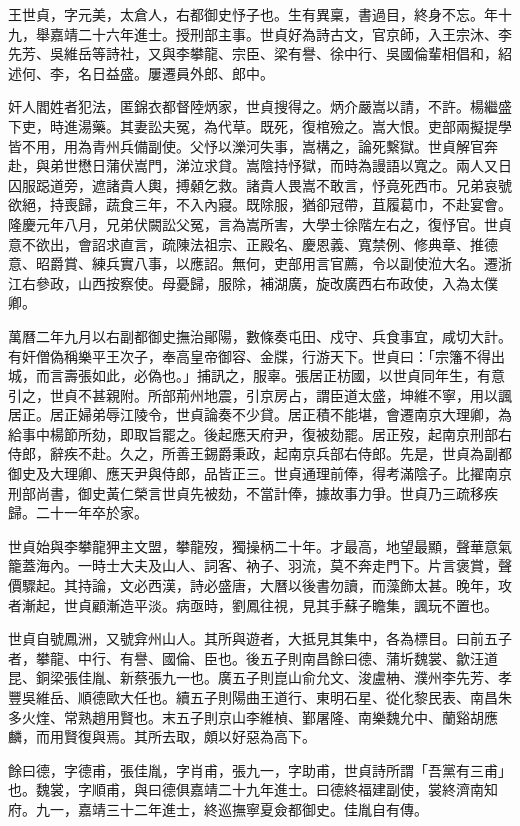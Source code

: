 \begin{pinyinscope}
王世貞，字元美，太倉人，右都御史忬子也。生有異稟，書過目，終身不忘。年十九，舉嘉靖二十六年進士。授刑部主事。世貞好為詩古文，官京師，入王宗沐、李先芳、吳維岳等詩社，又與李攀龍、宗臣、梁有譽、徐中行、吳國倫輩相倡和，紹述何、李，名日益盛。屢遷員外郎、郎中。

奸人閻姓者犯法，匿錦衣都督陸炳家，世貞搜得之。炳介嚴嵩以請，不許。楊繼盛下吏，時進湯藥。其妻訟夫冤，為代草。既死，復棺殮之。嵩大恨。吏部兩擬提學皆不用，用為青州兵備副使。父忬以濼河失事，嵩構之，論死繫獄。世貞解官奔赴，與弟世懋日蒲伏嵩門，涕泣求貸。嵩陰持忬獄，而時為謾語以寬之。兩人又日囚服跽道旁，遮諸貴人輿，搏顙乞救。諸貴人畏嵩不敢言，忬竟死西市。兄弟哀號欲絕，持喪歸，蔬食三年，不入內寢。既除服，猶卻冠帶，苴履葛巾，不赴宴會。隆慶元年八月，兄弟伏闕訟父冤，言為嵩所害，大學士徐階左右之，復忬官。世貞意不欲出，會詔求直言，疏陳法祖宗、正殿名、慶恩義、寬禁例、修典章、推德意、昭爵賞、練兵實八事，以應詔。無何，吏部用言官薦，令以副使涖大名。遷浙江右參政，山西按察使。母憂歸，服除，補湖廣，旋改廣西右布政使，入為太僕卿。

萬曆二年九月以右副都御史撫治鄖陽，數條奏屯田、戍守、兵食事宜，咸切大計。有奸僧偽稱樂平王次子，奉高皇帝御容、金牒，行游天下。世貞曰：「宗籓不得出城，而言壽張如此，必偽也。」捕訊之，服辜。張居正枋國，以世貞同年生，有意引之，世貞不甚親附。所部荊州地震，引京房占，謂臣道太盛，坤維不寧，用以諷居正。居正婦弟辱江陵令，世貞論奏不少貸。居正積不能堪，會遷南京大理卿，為給事中楊節所劾，即取旨罷之。後起應天府尹，復被劾罷。居正歿，起南京刑部右侍郎，辭疾不赴。久之，所善王錫爵秉政，起南京兵部右侍郎。先是，世貞為副都御史及大理卿、應天尹與侍郎，品皆正三。世貞通理前俸，得考滿陰子。比擢南京刑部尚書，御史黃仁榮言世貞先被劾，不當計俸，據故事力爭。世貞乃三疏移疾歸。二十一年卒於家。

世貞始與李攀龍狎主文盟，攀龍歿，獨操柄二十年。才最高，地望最顯，聲華意氣籠蓋海內。一時士大夫及山人、詞客、衲子、羽流，莫不奔走門下。片言褒賞，聲價驟起。其持論，文必西漢，詩必盛唐，大曆以後書勿讀，而藻飾太甚。晚年，攻者漸起，世貞顧漸造平淡。病亟時，劉鳳往視，見其手蘇子瞻集，諷玩不置也。

世貞自號鳳洲，又號弇州山人。其所與遊者，大抵見其集中，各為標目。曰前五子者，攀龍、中行、有譽、國倫、臣也。後五子則南昌餘曰德、蒲圻魏裳、歙汪道昆、銅梁張佳胤、新蔡張九一也。廣五子則崑山俞允文、浚盧柟、濮州李先芳、孝豐吳維岳、順德歐大任也。續五子則陽曲王道行、東明石星、從化黎民表、南昌朱多火煃、常熟趙用賢也。末五子則京山李維楨、鄞屠隆、南樂魏允中、蘭谿胡應麟，而用賢復與焉。其所去取，頗以好惡為高下。

餘曰德，字德甫，張佳胤，字肖甫，張九一，字助甫，世貞詩所謂「吾黨有三甫」也。魏裳，字順甫，與曰德俱嘉靖二十九年進士。曰德終福建副使，裳終濟南知府。九一，嘉靖三十二年進士，終巡撫寧夏僉都御史。佳胤自有傳。


\end{pinyinscope}
